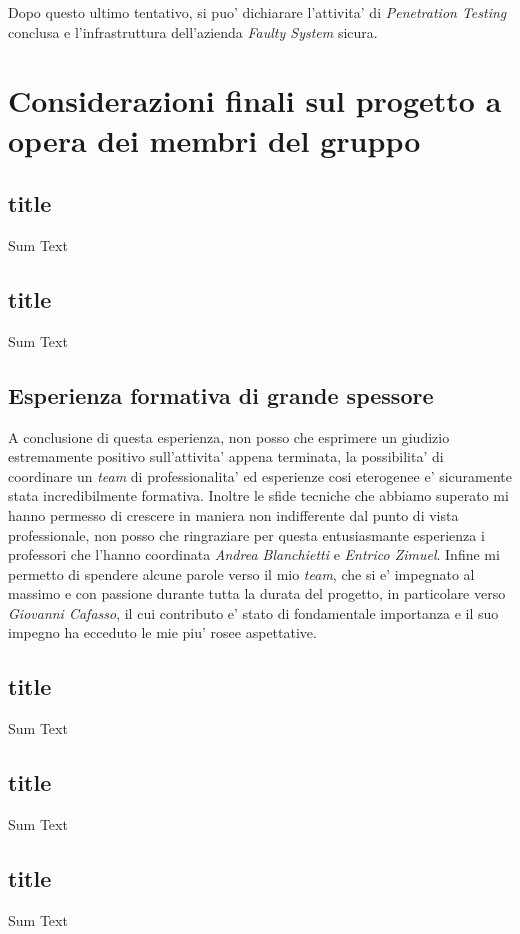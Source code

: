 \documentclass[a4paper]{report}
\begin{document}
		Dopo questo ultimo tentativo, si puo' dichiarare l'attivita' di \emph{Penetration Testing} conclusa e
		l'infrastruttura dell'azienda \emph{Faulty System} sicura.

\chapter{Considerazioni finali sul progetto a opera dei membri del gruppo}
	\section{title}
	\author{Riccardo De Lazzari}

	Sum Text
	\section{title}
	\author{Lorenzo Dellera}

	Sum Text
	\section{Esperienza formativa di grande spessore}
	\author{Riccardo Oglietti}

	A conclusione di questa esperienza, non posso che esprimere un giudizio estremamente positivo sull'attivita' appena 
	terminata, la possibilita' di coordinare un \emph{team} di professionalita' ed esperienze cosi eterogenee e'
	sicuramente stata incredibilmente formativa. Inoltre le sfide tecniche che abbiamo superato mi hanno permesso di
	crescere in maniera non indifferente dal punto di vista professionale, non posso che ringraziare per questa
	entusiasmante esperienza i professori che l'hanno coordinata \emph{Andrea Blanchietti} e \emph{Entrico Zimuel}.
	Infine mi permetto di spendere alcune parole verso il mio \emph{team}, che si e' impegnato
	al massimo e con passione durante tutta la durata del progetto, in particolare verso \emph{Giovanni Cafasso}, il cui
	contributo e' stato di fondamentale importanza e il suo impegno ha ecceduto le mie piu' rosee aspettative.
	\section{title}
	\author{Giovanni Cafasso}

	Sum Text
	\section{title}
	\author{Riccardo Carrieri}

	Sum Text
	\section{title}
	\author{Alessio Murta}

	Sum Text
\end{document}
